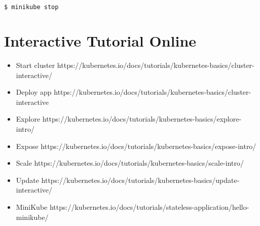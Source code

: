 \begin{lstlisting}[language=bash]
$ minikube stop
\end{lstlisting}

\section{Interactive Tutorial Online}

\begin{itemize}

\item
  Start cluster
  https://kubernetes.io/docs/tutorials/kubernetes-basics/cluster-interactive/
\item
  Deploy app
  https://kubernetes.io/docs/tutorials/kubernetes-basics/cluster-interactive
\item
  Explore
  https://kubernetes.io/docs/tutorials/kubernetes-basics/explore-intro/
\item
  Expose
  https://kubernetes.io/docs/tutorials/kubernetes-basics/expose-intro/
\item
  Scale
  https://kubernetes.io/docs/tutorials/kubernetes-basics/scale-intro/
\item
  Update
  https://kubernetes.io/docs/tutorials/kubernetes-basics/update-interactive/
\item
  MiniKube
  https://kubernetes.io/docs/tutorials/stateless-application/hello-minikube/
\end{itemize}
